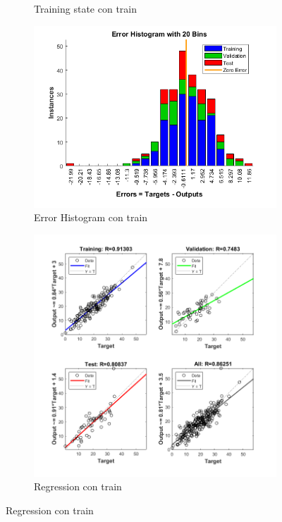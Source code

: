 \documentclass[a4paper, 12pt]{article}
\begin{document}
\begin{figure}[htp!]
\begin{subfigure}{0.49\textwidth}
                        \caption{Training state con train}
                    \end{subfigure}
                    \begin{subfigure}{0.49\textwidth}
                        \includegraphics[width=\textwidth]{figures/parte1/Ej3/Ej3_error_train_60.png}
                        \caption{Error Histogram con train}
                    \end{subfigure}
                    \begin{subfigure}{0.49\textwidth}
                        \includegraphics[width=\textwidth]{figures/parte1/Ej3/Ej3_regression_train_60.png}
                        \caption{Regression con train}
                    \end{subfigure}
                \end{figure}
\end{document}
